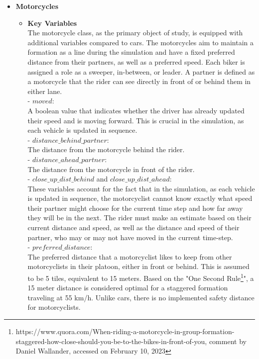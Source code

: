 \begin{itemize}
     \item \textbf{Motorcycles}
     \begin{itemize}
         \item \textbf{Key Variables}\\
          The motorcycle class, as the primary object of study, is equipped with additional variables compared to cars. The motorcycles aim to maintain a formation as a line during the simulation and have a fixed preferred distance from their partners, as well as a preferred speed. Each biker is assigned a role as a sweeper, in-between, or leader. A partner is defined as a motorcycle that the rider can see directly in front of or behind them in either lane. \\
          - $moved$:\\
          A boolean value that indicates whether the driver has already updated their speed and is moving forward. This is crucial in the simulation, as each vehicle is updated in sequence.\\
          - $distance\_behind\_partner$:\\
          The distance from the motorcycle behind the rider. \\
          - $distance\_ahead\_partner$:\\
          The distance from the motorcycle in front of the rider. \\
          - $close\_up\_dist\_behind$ and $close\_up\_dist\_ahead$:\\
          These variables account for the fact that in the simulation, as each vehicle is updated in sequence, the motorcyclist cannot know exactly what speed their partner might choose for the current time step and how far away they will be in the next. The rider must make an estimate based on their current distance and speed, as well as the distance and speed of their partner, who may or may not have moved in the current time-step.\\
          - $preferred\_distance$:\\
          The preferred distance that a motorcyclist likes to keep from other motorcyclists in their platoon, either in front or behind. This is assumed to be 5 tiles, equivalent to 15 meters. Based on the "One Second Rule\footnote{https://www.quora.com/When-riding-a-motorcycle-in-group-formation-staggered-how-close-should-you-be-to-the-bikes-in-front-of-you, comment by Daniel Wallander, accessed on February 10, 2023}", a 15 meter distance is considered optimal for a staggered formation traveling at 55 km/h. Unlike cars, there is no implemented safety distance for motorcyclists.\\

\end{itemize}
\end{itemize}
